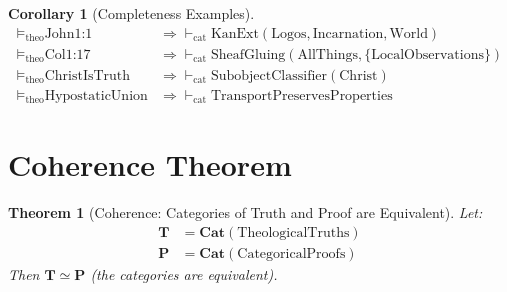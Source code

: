 \documentclass{article}
\newtheorem{theorem}{Theorem}
\newtheorem{corollary}{Corollary}
\begin{document}
\begin{corollary}[Completeness Examples]
\begin{align*}
\models_{\text{theo}} \text{John1:1} &\Rightarrow \vdash_{\text{cat}} \text{KanExt}(\text{Logos}, \text{Incarnation}, \text{World}) \\
\models_{\text{theo}} \text{Col1:17} &\Rightarrow \vdash_{\text{cat}} \text{SheafGluing}(\text{AllThings}, \{\text{LocalObservations}\}) \\
\models_{\text{theo}} \text{ChristIsTruth} &\Rightarrow \vdash_{\text{cat}} \text{SubobjectClassifier}(\text{Christ}) \\
\models_{\text{theo}} \text{HypostaticUnion} &\Rightarrow \vdash_{\text{cat}} \text{TransportPreservesProperties}
\end{align*}
\end{corollary}

\section{Coherence Theorem}

\begin{theorem}[Coherence: Categories of Truth and Proof are Equivalent]
Let:
\begin{align*}
\mathbf{T} &= \mathbf{Cat}(\text{TheologicalTruths}) \\
\mathbf{P} &= \mathbf{Cat}(\text{CategoricalProofs})
\end{align*}
Then $\mathbf{T} \simeq \mathbf{P}$ (the categories are equivalent).
\end{theorem}
\end{document}
